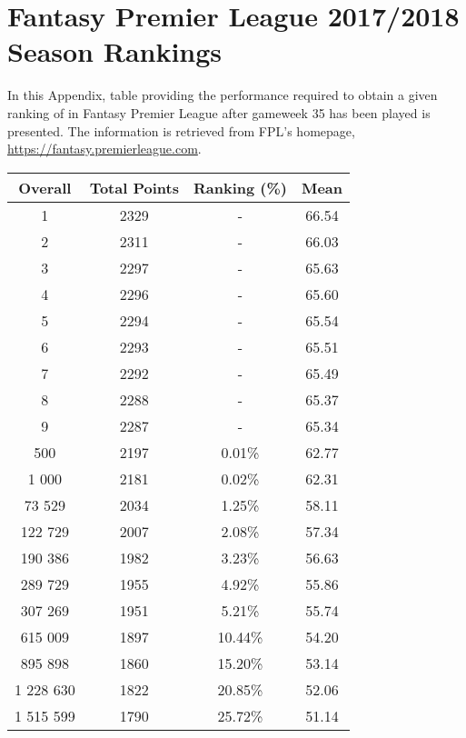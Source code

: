 \chapter{Fantasy Premier League 2017/2018 Season Rankings}\label{appendix_fpl_rankings}

In this Appendix, table providing the performance required to obtain a given ranking of in Fantasy Premier League after gameweek 35 has been played is presented. The information is retrieved from FPL's homepage, \url{https://fantasy.premierleague.com}. 


\begin{table}[H]
\centering
\begin{tabular}{@{}cccc@{}}
\toprule
Overall   & Total Points & Ranking (\%) & Mean  \\ \midrule
1         & 2329         & -            & 66.54 \\
2         & 2311         & -            & 66.03 \\
3         & 2297         & -            & 65.63 \\
4         & 2296         & -            & 65.60 \\
5         & 2294         & -            & 65.54 \\
6         & 2293         & -            & 65.51 \\
7         & 2292         & -            & 65.49 \\
8         & 2288         & -            & 65.37 \\
9         & 2287         & -            & 65.34 \\
500       & 2197         & 0.01\%       & 62.77 \\
1 000     & 2181         & 0.02\%       & 62.31 \\
73 529    & 2034         & 1.25\%       & 58.11 \\
122 729   & 2007         & 2.08\%       & 57.34 \\
190 386   & 1982         & 3.23\%       & 56.63 \\
289 729   & 1955         & 4.92\%       & 55.86 \\
307 269   & 1951         & 5.21\%       & 55.74 \\
615 009   & 1897         & 10.44\%      & 54.20 \\
895 898   & 1860         & 15.20\%      & 53.14 \\
1 228 630 & 1822         & 20.85\%      & 52.06 \\
1 515 599 & 1790         & 25.72\%      & 51.14 \\

\end{tabular}
\end{table}
